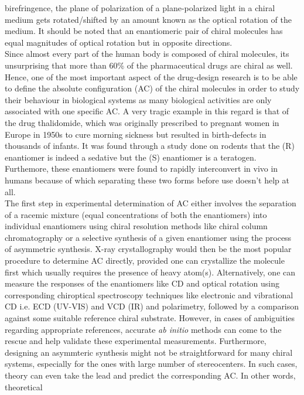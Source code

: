birefringence, the plane of polarization of a plane-polarized light in a chiral medium gets rotated/shifted
by an amount known as the optical rotation of the medium. It should be noted that an enantiomeric pair of chiral
molecules has equal magnitudes of optical rotation but in opposite directions.\\
Since almost every part of the human body is composed of chiral molecules, its unsurprising that
more than 60\% of the pharmaceutical drugs are chiral as well. Hence, one of the most 
important aspect of the drug-design research is to be able to define the absolute configuration 
(AC) of the chiral molecules in order to study their behaviour in  biological systems as 
many biological activities are only associated with one specific AC. A very tragic example
in this regard is that of the drug thalidomide, which was originally prescribed to pregnant women in 
Europe in 1950s to cure morning sickness but resulted in birth-defects in thousands of 
infants. It was found through a study done on rodents that the (R) enantiomer is indeed 
a sedative but the (S) enantiomer is a teratogen\cite{Crawford06}. Furthemore, these enantiomers were 
found to rapidly interconvert in vivo in humans because of which separating 
these two forms before use doesn't help at all.
\\
The first step in experimental determination of AC either involves the separation of 
a racemic mixture (equal concentrations of both the enantiomers) into individual enantiomers
using chiral resolution methods like chiral column chromatography or a selective synthesis
of a given enantiomer using the process of asymmetric synthesis. X-ray crystallography would then be the 
most popular procedure to determine AC directly, provided one can crystallize the molecule first which usually 
requires the presence of heavy atom(s). Alternatively, one can measure the responses of 
the enantiomers like CD and optical rotation using corresponding chiroptical spectroscopy
techniques like electronic and vibrational CD i.e. ECD (UV-VIS) and VCD (IR) and polarimetry,
followed by a comparison against some suitable reference chiral substrate. However, in cases of 
ambiguities regarding appropriate references, accurate {\em ab initio} methods can come to the rescue and 
help validate these experimental measurements. Furthermore, designing an asymmteric synthesis might not
be straightforward for many chiral systems, especially for the ones with large number of stereocenters. 
In such cases, theory can even take the lead and predict the corresponding AC. In other words, theoretical
